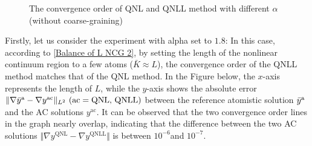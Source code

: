 
\begin{figure}[h!]
	\centering
	\caption{The convergence order of QNL and QNLL method with different $\alpha$ (without coarse-graining)}
	\label{fig: convergence_QNL_QNLL_NCG}
\end{figure}


Firstly, let us consider the experiment with alpha set to $1.8$: In this case, according to \eqref{Balance of L NCG 2}, by setting the length of the nonlinear continuum region to a few atoms ($\bar{K} \approx L$), the convergence order of the QNLL method matches that of the QNL method. In the Figure below, the $x$-axis represents the length of $L$, while the $y$-axis shows the absolute error $\Vert \nabla \bar{y}^{{\rm a}} - \nabla y^{\text{ac}} \Vert_{L^{2}}~\text{(ac} = \text{QNL, QNLL)}$ between the reference atomistic solution $\bar{y}^{{\rm a}}$ and the AC solutions $y^{\text{ac}}$. It can be observed that the two convergence order lines in the graph nearly overlap, indicating that the difference between the two AC solutions $\Vert \nabla y^{\text{QNL}} - \nabla y^{\text{QNLL}}\Vert$ is between $10^{-6} $and $10^{-7}$.

